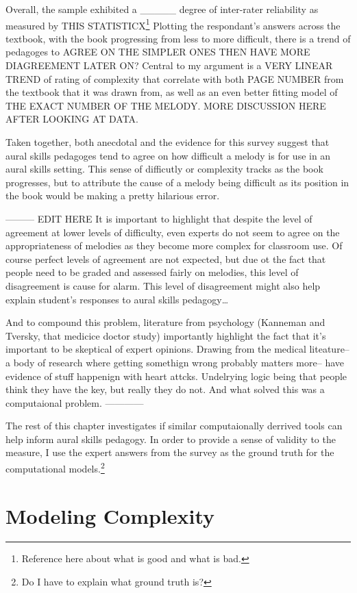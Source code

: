 \documentclass[]{book}
\let\rmarkdownfootnote\footnote%
\def\footnote{\protect\rmarkdownfootnote}
\begin{document}
Overall, the sample exhibited a \_\_\_\_\_ degree of inter-rater reliability as measured by THIS STATISTICX\footnote{Reference here about what is good and what is bad.}
Plotting the respondant's answers across the textbook, with the book progressing from less to more difficult, there is a trend of pedagoges to AGREE ON THE SIMPLER ONES THEN HAVE MORE DIAGREEMENT LATER ON?
Central to my argument is a VERY LINEAR TREND of rating of complexity that correlate with both PAGE NUMBER from the textbook that it was drawn from, as well as an even better fitting model of THE EXACT NUMBER OF THE MELODY.
MORE DISCUSSION HERE AFTER LOOKING AT DATA.

Taken together, both anecdotal and the evidence for this survey suggest that aural skills pedagoges tend to agree on how difficult a melody is for use in an aural skills setting.
This sense of difficutly or complexity tracks as the book progresses, but to attribute the cause of a melody being difficult as its position in the book would be making a pretty hilarious error.

--------- EDIT HERE
It is important to highlight that despite the level of agreement at lower levels of difficulty, even experts do not seem to agree on the appropriateness of melodies as they become more complex for classroom use.
Of course perfect levels of agreement are not expected, but due ot the fact that people need to be graded and assessed fairly on melodies, this level of disagreement is cause for alarm.
This level of disagreement might also help explain student's responses to aural skills pedagogy\ldots{}

And to compound this problem, literature from psychology (Kanneman and Tversky, that medicice doctor study) importantly highlight the fact that it's important to be skeptical of expert opinions.
Drawing from the medical liteature-- a body of research where getting somethign wrong probably matters more-- have evidence of stuff happenign with heart attcks.
Undelrying logic being that people think they have the key, but really they do not.
And what solved this was a computaional problem.
------------

The rest of this chapter investigates if similar computaionally derrived tools can help inform aural skills pedagogy.
In order to provide a sense of validity to the measure, I use the expert answers from the survey as the ground truth for the computational models.\footnote{Do I have to explain what ground truth is?}

\hypertarget{modeling-complexity}{%
\section{Modeling Complexity}\label{modeling-complexity}}
\end{document}
